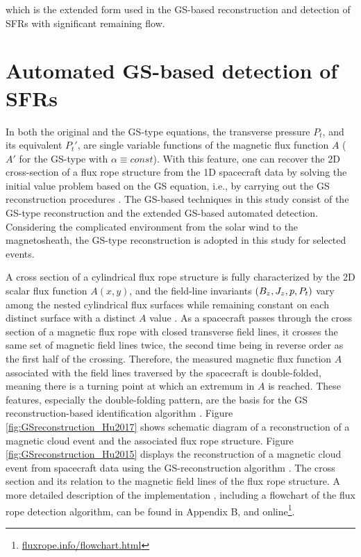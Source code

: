 which is the extended form used in the GS-based reconstruction and detection of SFRs with significant remaining flow.

\section{Automated GS-based detection of SFRs}\label{sec:GS-detection}
In both the original and the GS-type equations, the transverse pressure $P_t$, and its equivalent $P_t'$, are single variable functions of the magnetic flux function $A$ ($A'$ for the GS-type with $\alpha\equiv const$). With this feature, one can recover the 2D cross-section of a flux rope structure from the 1D spacecraft data by solving the initial value problem based on the GS equation, i.e., by carrying out the GS reconstruction procedures \citep{Hau:1999, HuSonnerup:2002, Hu:2017}. The GS-based techniques in this study consist of the GS-type reconstruction and the extended GS-based automated detection. Considering the complicated environment from the solar wind to the magnetosheath, the GS-type reconstruction is adopted in this study for selected events.

A cross section of a cylindrical flux rope structure is fully characterized by the 2D scalar flux function $A(x, y)$, and the field-line invariants $\left( B_z,J_z,p, P_t \right)$ vary among the nested cylindrical flux surfaces while remaining constant on each distinct surface with a distinct $A$ value \citep{Hu:2018}. As a spacecraft passes through the cross section of a magnetic flux rope with closed transverse field lines, it crosses the same set of magnetic field lines twice, the second time being in reverse order as the first half of the crossing. Therefore, the measured magnetic flux function $A$ associated with the field lines traversed by the spacecraft is double-folded, meaning there is a turning point at which an extremum in $A$ is reached. These features, especially the double-folding pattern, are the basis for the GS reconstruction-based identification algorithm \citep{Hu:2018}. Figure \ref{fig:GSreconstruction_Hu2017} shows schematic diagram of a reconstruction of a magnetic cloud event and the associated flux rope structure. Figure \ref{fig:GSreconstruction_Hu2015} displays the reconstruction of a magnetic cloud event from spacecraft data using the GS-reconstruction algorithm \citep{Hu:2015,Hu:2018}. The cross section and its relation to the magnetic field lines of the flux rope structure. A more detailed description of the implementation \citep{Hu:2018}, including a flowchart of the flux rope detection algorithm, can be found in Appendix B, and online\footnote{\url{fluxrope.info/flowchart.html}}. %

